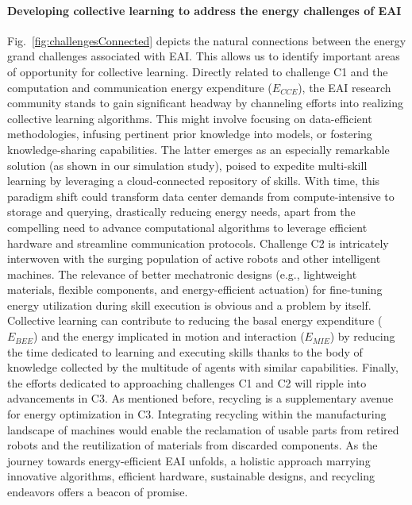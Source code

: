 \documentclass[12pt]{article}
\begin{document}
\paragraph*{Developing collective learning to address the energy challenges of EAI}
Fig.~\ref{fig:challengesConnected} depicts the natural connections between the energy grand challenges associated with EAI. This allows us to identify important areas of opportunity for collective learning. Directly related to challenge C1 and the computation and communication energy expenditure ($E_{CCE}$), the EAI research community stands to gain significant headway by channeling efforts into realizing collective learning algorithms. This might involve focusing on data-efficient methodologies, infusing pertinent prior knowledge into models, or fostering knowledge-sharing capabilities. The latter emerges as an especially remarkable solution (as shown in our simulation study), poised to expedite multi-skill learning by leveraging a cloud-connected repository of skills. With time, this paradigm shift could transform data center demands from compute-intensive to storage and querying, drastically reducing energy needs, apart from the compelling need to advance computational algorithms to leverage efficient hardware and streamline communication protocols. Challenge C2 is intricately interwoven with the surging population of active robots and other intelligent machines. The relevance of better mechatronic designs (e.g., lightweight materials, flexible components, and energy-efficient actuation) for fine-tuning energy utilization during skill execution is obvious and a problem by itself. Collective learning can contribute to reducing the basal energy expenditure ($E_{BEE}$) and the energy implicated in motion and interaction ($E_{MIE}$) by reducing the time dedicated to learning and executing skills thanks to the body of knowledge collected by the multitude of agents with similar capabilities. Finally, the efforts dedicated to approaching challenges C1 and C2 will ripple into advancements in C3. As mentioned before, recycling is a supplementary avenue for energy optimization in C3. Integrating recycling within the manufacturing landscape of machines would enable the reclamation of usable parts from retired robots and the reutilization of materials from discarded components. As the journey towards energy-efficient EAI unfolds, a holistic approach marrying innovative algorithms, efficient hardware, sustainable designs, and recycling endeavors offers a beacon of promise.
\end{document}
